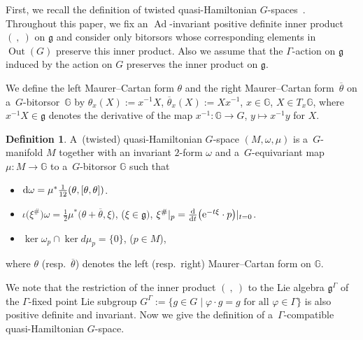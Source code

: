 \documentclass[pdftex]{sigma}
\numberwithin{equation}{section}
\theoremstyle{definition}
\newtheorem{Definition}[Theorem]{Definition}
\newcommand{\Ad}{\operatorname{Ad}}
\newcommand{\Out}{\operatorname{Out}}
\newcommand{\bG}{\mathbb{G}}
\begin{document}
First, we recall the definition of twisted quasi-Hamiltonian $G$-spaces~\cite{B-Y2015,Meinrenken2017}.
Throughout this paper, we fix an $\Ad$-invariant positive definite inner product $(\ ,\ )$ on $\mathfrak{g}$ and consider only bitorsors whose corresponding elements in $\Out(G)$ preserve this inner product.
Also we assume that the $\Gamma$-action on $\mathfrak{g}$ induced by the action on $G$ preserves the inner product on $\mathfrak{g}$.

We define the left Maurer--Cartan form $\theta$ and the right Maurer--Cartan form~$\overline{\theta}$ on a~$G$-bitorsor~$\bG$ by
$\theta_x(X) := x^{-1}X$, $ \overline{\theta}_x(X) := Xx^{-1}$, $ x \in \bG$, $ X \in T_x\bG$,
where $x^{-1}X \in \mathfrak{g}$ denotes the derivative of the map $x^{-1} \colon \bG \to G$, $ y \mapsto x^{-1}y$ for $X$.

\begin{Definition} A~(twisted) quasi-Hamiltonian $G$-space $(M, \omega, \mu)$ is a~$G$-manifold $M$ together with an invariant $2$-form $\omega$ and a~$G$-equivariant map $\mu \colon M \to \bG$ to a~$G$-bitorsor $\bG$ such that
\begin{itemize}\itemsep=0pt\setlength{\leftskip}{0.30cm}
 \item[(QH1)] ${\rm d}\omega = \mu^* \frac{1}{12}(\theta,[\theta,\theta])$.
 \item[(QH2)] $\iota \bigl(\xi ^{\#}\bigr)\omega = \frac{1}{2} \mu^* \bigl(\theta + \overline{\theta},\xi\bigr) $, ($\xi \in \mathfrak{g})$, $\xi^{\#}|_p = \frac{\rm d}{{\rm d} t}\bigl({\rm e}^{-t\xi}\cdot p\bigr)|_{t=0}$.
 \item[(QH3)] $\ker \omega_p \cap \ker d\mu_p =\{0\}$, ($p \in M$),
 \end{itemize}
where $\theta$ (resp.\ $\overline{\theta}$) denotes the left (resp.\ right) Maurer--Cartan form on $\bG$.
\end{Definition}

We note that the restriction of the inner product $(\ ,\ )$ to the Lie algebra $\mathfrak{g}^{\Gamma}$ of the $\Gamma$-fixed point Lie subgroup $G^{\Gamma} := \{g \in G\mid \varphi \cdot g = g \text{ for all } \varphi \in \Gamma\}$ is also positive definite and invariant.
Now we give the definition of a~$\Gamma$-compatible quasi-Hamiltonian $G$-space.
\end{document}
